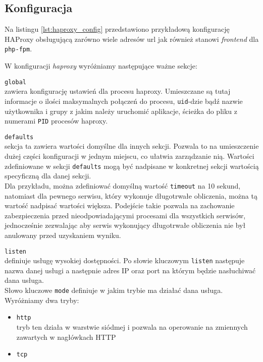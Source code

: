 {\subsection{Konfiguracja}
\label{sec:haproxy_config}
Na listingu  \ref{lst:haproxy_config} przedstawiono przykładową konfigurację HAProxy obsługującą zarówno wiele adresów url jak również stanowi \textit{frontend} dla \texttt{php-fpm}.

W konfiguracji \textit{haproxy} wyróżniamy następujące ważne sekcje:
\begin{description}
	\item{\texttt{global}}\\
		zawiera konfigurację ustawień dla procesu haproxy.
		Umieszczane są tutaj informacje o ilości maksymalnych połączeń do procesu, \texttt{uid}-dzie bądź nazwie użytkownika i grupy z jakim należy uruchomić aplikacje, ścieżka do pliku z numerami \texttt{PID} procesów haproxy.
	\item{\texttt{defaults}}\\
		sekcja ta zawiera wartości domyślne dla innych sekcji.
		Pozwala to na umieszczenie dużej części konfiguracji w jednym miejscu, co ułatwia zarządzanie nią.
		Wartości zdefiniowane w sekcji \texttt{defaults} mogą być nadpisane w konkretnej sekcji wartością specyficzną dla danej sekcji.\\
		Dla przykładu, można zdefiniować domyślną wartość \texttt{timeout} na 10 sekund, natomiast dla pewnego serwisu, który wykonuje długotrwałe obliczenia, można tą wartość nadpisać wartości większa.
		Podejście takie pozwala na zachowanie zabezpieczenia przed nieodpowiadającymi procesami dla wszystkich serwisów, jednocześnie zezwalając aby serwis wykonujący długotrwałe obliczenia nie był anulowany przed uzyskaniem wyniku.
	\item{\texttt{listen}}\\
		definiuje usługę wysokiej dostępności. Po słowie kluczowym \texttt{listen} następuje nazwa danej usługi a następnie adres IP oraz port na którym będzie nasłuchiwać dana usługa.\\
		Słowo kluczowe \texttt{mode} definiuje w jakim trybie ma działać dana usługa.
		Wyróżniamy dwa tryby:
		\begin{itemize}
			\item \texttt{http}\\
				tryb ten działa w warstwie siódmej i pozwala na operowanie na zmiennych zawartych w nagłówkach HTTP
			\item \texttt{tcp}\\

\end{itemize}
\end{description}}
